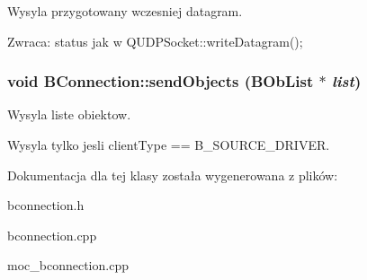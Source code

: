 Wysyla przygotowany wczesniej datagram. 

\begin{Desc}
\item[Zwraca:]status jak w QUDPSocket::writeDatagram(); \end{Desc}
\hypertarget{class_b_connection_348456770c1f73c004ea60d03fca1a41}{
\subsubsection[{sendObjects}]{\setlength{\rightskip}{0pt plus 5cm}void BConnection::sendObjects ({\bf BObList} $\ast$ {\em list})}}
\label{class_b_connection_348456770c1f73c004ea60d03fca1a41}


Wysyla liste obiektow. 

Wysyla tylko jesli clientType == B\_\-SOURCE\_\-DRIVER. 

Dokumentacja dla tej klasy została wygenerowana z plików:\begin{CompactItemize}
\item 
bconnection.h\item 
bconnection.cpp\item 
moc\_\-bconnection.cpp\end{CompactItemize}
